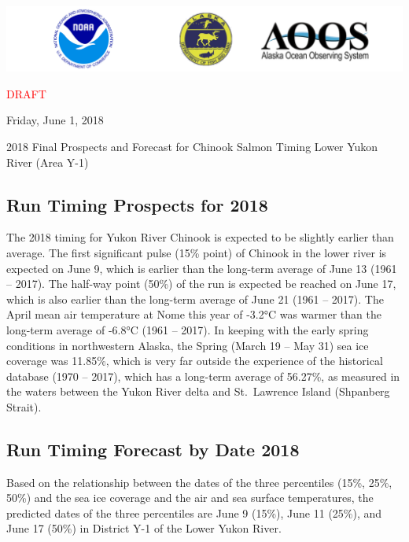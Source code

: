\documentclass[]{article}
\title{}
\author{}
\date{}
\begin{document}
\includegraphics{images/combined.png}

\textcolor{red}{\large{DRAFT}}

Friday, June 1, 2018

\begin{center}
  \huge{2018 Final Prospects and Forecast for Chinook Salmon Timing}
  \large{Lower Yukon River (Area Y-1)}
\end{center}

\hypertarget{run-timing-prospects-for-2018}{%
\subsection{Run Timing Prospects for
2018}\label{run-timing-prospects-for-2018}}

The 2018 timing for Yukon River Chinook is expected to be slightly
earlier than average. The first significant pulse (15\% point) of
Chinook in the lower river is expected on June 9, which is earlier than
the long-term average of June 13 (1961 -- 2017). The half-way point
(50\%) of the run is expected be reached on June 17, which is also
earlier than the long-term average of June 21 (1961 -- 2017). The April
mean air temperature at Nome this year of -3.2°C was warmer than the
long-term average of -6.8°C (1961 -- 2017). In keeping with the early
spring conditions in northwestern Alaska, the Spring (March 19 -- May
31) sea ice coverage was 11.85\%, which is very far outside the
experience of the historical database (1970 -- 2017), which has a
long-term average of 56.27\%, as measured in the waters between the
Yukon River delta and St.~Lawrence Island (Shpanberg Strait).

\hypertarget{run-timing-forecast-by-date-2018}{%
\subsection{Run Timing Forecast by Date
2018}\label{run-timing-forecast-by-date-2018}}

Based on the relationship between the dates of the three percentiles
(15\%, 25\%, 50\%) and the sea ice coverage and the air and sea surface
temperatures, the predicted dates of the three percentiles are June 9
(15\%), June 11 (25\%), and June 17 (50\%) in District Y-1 of the Lower
Yukon River.
\end{document}
